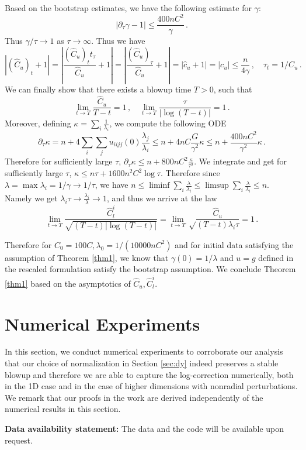 \documentclass[12pt]{caltech_thesis}
\numberwithin{equation}{section}
\begin{document}
Based on the bootstrap estimates, we have the following estimate for   $\gamma$: $$|\partial_\tau\gamma-1|\leq\frac{400nC^2}{\gamma}\,.$$
Thus  $\gamma/\tau\to 1$ as $\tau\to\infty$.  Thus we have $$|(\hat{C}_u)_t+1|=|\frac{(\hat{C}_u)_t t_\tau}{\hat{C}_u}+1|=|\frac{(\hat{C}_u)_\tau}{\hat{C}_u}+1|=|\hat{c}_u+1|=|c_u|\leq\frac{n}{4\gamma}\,,\quad \tau_t=1/\hat{C}_u\,.$$
We can finally show that there exists a blowup time $T>0$, such that $$\lim_{t\to T}\frac{\hat{C}_u}{T-t}=1\,,\quad\lim_{t\to T}\frac{\tau}{|\log(T-t)|}=1\,.$$ %
Moreover, defining $\kappa=\sum_i\frac{1}{\lambda_i}$, we compute the following ODE $$\partial_\tau\kappa=n+4\sum_i\sum_j u_{iijj}(0)\frac{\lambda_j}{\lambda_i}\leq n+4nC\frac{G}{\gamma^2}\kappa\leq n+\frac{400nC^2}{\gamma^2}\kappa\,. $$
Therefore for sufficiently large $\tau$, $\partial_\tau\kappa\leq n+800nC^2\frac{\kappa}{\tau^2}$. We integrate and get for sufficiently large $\tau$, $\kappa\leq n\tau+1600n^2C^2\log\tau$. Therefore since $\lambda=\max{\lambda_i}=1/\gamma\to1/\tau$, we have $n\leq\liminf\sum_i\frac{\lambda}{\lambda_i}\leq\limsup\sum_i\frac{\lambda}{\lambda_i}\leq n.$ Namely we get $\lambda_i\tau\to\frac{\lambda_i}{\lambda}\to1$, and thus we arrive at the law $$\lim_{t\to T}\frac{\hat{C}^i_l}{\sqrt{(T-t)|\log(T-t)|}}=\lim_{t\to T}\sqrt\frac{\hat{C}_u}{{(T-t)\lambda_i\tau}}= 1\,.$$ 

Therefore for $C_0=100C, \lambda_0=1/(10000nC^2)$ and for initial data satisfying the assumption of Theorem \ref{thm1}, we know that $\gamma(0)=1/\lambda$ and   $u=g$ defined in the rescaled formulation satisfy the bootstrap assumption.
We conclude Theorem \ref{thm1} based on the asymptotics of $\hat{C}_u, \hat{C}_l^i$.

 


 
\section{Numerical Experiments}\label{sec:num}
In this section, we conduct numerical experiments to corroborate our analysis that our choice of normalization in Section \ref{sec:dy} indeed preserves a stable blowup and therefore we are able to capture the log-correction numerically, both in the 1D case and in the case of higher dimensions with nonradial perturbations. We remark that our proofs in the work are derived independently of the numerical results in this section. 

\textbf{Data availability statement:} The data and the code will be available upon request.
\end{document}
